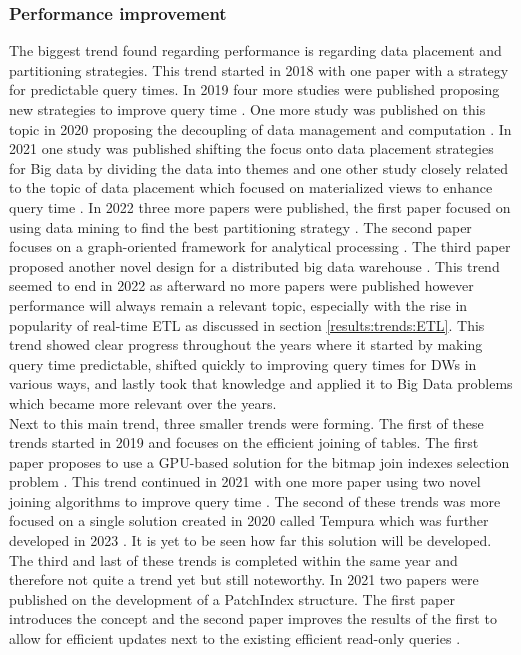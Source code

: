 \documentclass[11pt]{article}
\begin{document}
\subsubsection{Performance improvement}
\label{results:trends:performance}
The biggest trend found regarding performance is regarding data placement and partitioning strategies. This trend started in 2018 with one paper \cite{Abbasi201863} with a strategy for predictable query times. In 2019 four more studies were published proposing new strategies to improve query time \cite{Du2019211, Ramdane2019189, Ramdane2019255, Kechar2019}. One more study was published on this topic in 2020 proposing the decoupling of data management and computation \cite{Liu202052}. In 2021 one study was published shifting the focus onto data placement strategies for Big data by dividing the data into themes \cite{Nie2021135} and one other study closely related to the topic of data placement which focused on materialized views to enhance query time \cite{Raipurkar20216191}. In 2022 three more papers were published, the first paper focused on using data mining to find the best partitioning strategy \cite{Ramdane2022107}. The second paper focuses on a graph-oriented framework for analytical processing \cite{Khalil2022547}. The third paper proposed another novel design for a distributed big data warehouse \cite{Ramdane2022}. This trend seemed to end in 2022 as afterward no more papers were published however performance will always remain a relevant topic, especially with the rise in popularity of real-time ETL as discussed in section \ref{results:trends:ETL}. This trend showed clear progress throughout the years where it started by making query time predictable, shifted quickly to improving query times for DWs in various ways, and lastly took that knowledge and applied it to Big Data problems which became more relevant over the years. \\

Next to this main trend, three smaller trends were forming. The first of these trends started in 2019 and focuses on the efficient joining of tables. The first paper proposes to use a GPU-based solution for the bitmap join indexes selection problem \cite{Toumi2019}. This trend continued in 2021 with one more paper using two novel joining algorithms to improve query time \cite{Aziz202141261}. The second of these trends was more focused on a single solution created in 2020 called Tempura \cite{Wang202014} which was further developed in 2023 \cite{Wang20231315}. It is yet to be seen how far this solution will be developed. The third and last of these trends is completed within the same year and therefore not quite a trend yet but still noteworthy. In 2021 two papers were published on the development of a PatchIndex structure. The first paper introduces the concept \cite{Kläbe2021833} and the second paper improves the results of the first to allow for efficient updates next to the existing efficient read-only queries \cite{Klabe20211991}. \\
\end{document}
